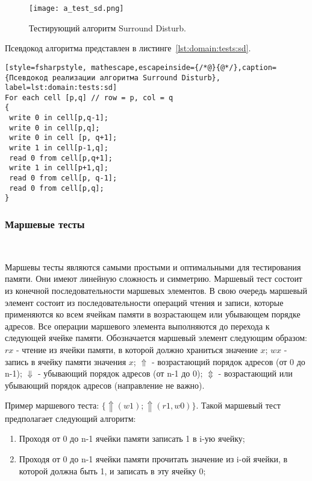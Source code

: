 \begin{figure}[ht]
\centering
  \texttt{[image: a\_test\_sd.png]}  
  \caption{ Тестирующий алгоритм Surround Disturb. }
  \label{fig:domain:tests:sd}
\end{figure} 

Псевдокод алгоритма представлен в листинге~\ref{lst:domain:tests:sd}.

\begin{lstlisting}[style=fsharpstyle, mathescape,escapeinside={/*@}{@*/},caption={Псевдокод реализации алгоритма Surround Disturb}, label=lst:domain:tests:sd]
For each cell [p,q] // row = p, col = q
{
 write 0 in cell[p,q-1];
 write 0 in cell[p,q];
 write 0 in cell [p, q+1];
 write 1 in cell[p-1,q];
 read 0 from cell[p,q+1];
 write 1 in cell[p+1,q];
 read 0 from cell[p, q-1];
 read 0 from cell[p,q];
}
\end{lstlisting}

\subsubsection{Маршевые тесты}~\\
\label{page:domain:tests:march}

Маршевы тесты являются самыми простыми и оптимальными для тестирования памяти. Они имеют линейную сложность и симметрию.
Маршевый тест состоит из конечной последовательности маршевых элементов. В свою очередь маршевый элемент состоит из последовательности операций чтения и записи, которые применяются ко всем ячейкам памяти в возрастающем или убывающем порядке адресов.
Все операции маршевого элемента выполняются до перехода к следующей ячейке памяти.
Обозначается маршевый элемент следующим образом: $rx$ - чтение из ячейки памяти, в которой должно храниться значение $x$; $wx$ - запись в ячейку памяти значения $x$; $\Uparrow$ - возрастающий порядок адресов (от 0 до n-1); $\Downarrow$ - убывающий порядок адресов (от n-1 до 0); $\Updownarrow$ - возрастающий или убывающий порядок адресов (направление не важно). 

Пример маршевого теста: $\{\Uparrow (w1); \Uparrow (r1,w0)\}$. Такой маршевый тест предполагает следующий алгоритм:

\begin{enumerate}
\item Проходя от 0 до n-1 ячейки памяти записать 1 в i-ую ячейку;
\item Проходя от 0 до n-1 ячейки памяти прочитать значение из i-ой ячейки, в которой должна быть 1, и записать в эту ячейку 0;
\end{enumerate}


